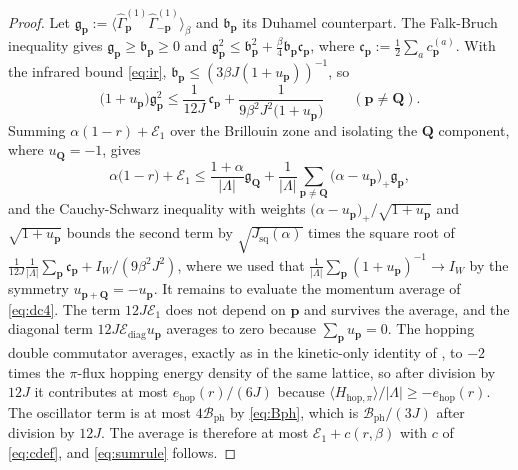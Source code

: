 \documentclass[11pt]{article}
\numberwithin{equation}{section}
\newcommand{\Lamb}{\Lambda}
\newcommand{\ph}{\mathrm{ph}}
\newcommand{\hop}{\mathrm{hop}}
\newcommand{\Gam}{\Gamma}
\theoremstyle{definition}
\begin{document}
\begin{proof}
Let $\mathfrak g_{\mathbf p}:=\langle\hat\Gam^{(1)}_{\mathbf p}\hat\Gam^{(1)}_{-\mathbf p}\rangle_{\beta}$
and $\mathfrak b_{\mathbf p}$ its Duhamel counterpart. The Falk-Bruch inequality gives
$\mathfrak g_{\mathbf p}\ge\mathfrak b_{\mathbf p}\ge0$ and
$\mathfrak g_{\mathbf p}^{2}\le\mathfrak b_{\mathbf p}^{2}+\frac{\beta}{4}\mathfrak b_{\mathbf p}\mathfrak c_{\mathbf p}$,
where $\mathfrak c_{\mathbf p}:=\frac12\sum_{a}c^{(a)}_{\mathbf p}$. With the infrared
bound \eqref{eq:ir}, $\mathfrak b_{\mathbf p}\le(3\beta J(1+u_{\mathbf p}))^{-1}$, so
\begin{equation}
\big(1+u_{\mathbf p}\big)\mathfrak g_{\mathbf p}^{2}\le\frac{1}{12J}\,\mathfrak c_{\mathbf p}
+\frac{1}{9\beta^{2}J^{2}\big(1+u_{\mathbf p}\big)}
\qquad(\mathbf p\ne\mathbf Q).
\label{eq:fb}
\end{equation}
Summing $\alpha(1-r)+\mathcal{E}_{1}$ over the Brillouin zone and isolating the
$\mathbf Q$ component, where $u_{\mathbf Q}=-1$, gives
\begin{equation}
\alpha\big(1-r\big)+\mathcal{E}_{1}\le\frac{1+\alpha}{|\Lamb|}\mathfrak g_{\mathbf Q}
+\frac{1}{|\Lamb|}\sum_{\mathbf p\ne\mathbf Q}\big(\alpha-u_{\mathbf p}\big)_{+}\mathfrak g_{\mathbf p},
\end{equation}
and the Cauchy-Schwarz inequality with weights $\big(\alpha-u_{\mathbf p}\big)_{+}/\sqrt{1+u_{\mathbf p}}$
and $\sqrt{1+u_{\mathbf p}}$ bounds the second term by
$\sqrt{J_{\mathrm{sq}}(\alpha)}$ times the square root of
$\frac{1}{12J}\frac{1}{|\Lamb|}\sum_{\mathbf p}\mathfrak c_{\mathbf p}+I_{W}/(9\beta^{2}J^{2})$,
where we used that $\frac{1}{|\Lamb|}\sum_{\mathbf p}(1+u_{\mathbf p})^{-1}\to I_{W}$ by the
symmetry $u_{\mathbf p+\mathbf Q}=-u_{\mathbf p}$. It remains to evaluate the momentum
average of \eqref{eq:dc4}. The term $12J\mathcal{E}_{1}$ does not depend on $\mathbf p$ and
survives the average, and the diagonal term $12J\mathcal{E}_{\mathrm{diag}}u_{\mathbf p}$
averages to zero because $\sum_{\mathbf p}u_{\mathbf p}=0$. The hopping double commutator
averages, exactly as in the kinetic-only identity of \cite{rens2026pkodlro}, to $-2$ times
the $\pi$-flux hopping energy density of the same lattice, so after division by $12J$ it
contributes at most $e_{\hop}(r)/(6J)$ because
$\langle H_{\hop,\pi}\rangle/|\Lamb|\ge-e_{\hop}(r)$. The oscillator term is at most
$4\mathcal{B}_{\ph}$ by \eqref{eq:Bph}, which is $\mathcal{B}_{\ph}/(3J)$ after division by
$12J$. The average is therefore at most $\mathcal{E}_{1}+c(r,\beta)$ with $c$ of
\eqref{eq:cdef}, and \eqref{eq:sumrule} follows.
\end{proof}
\end{document}
